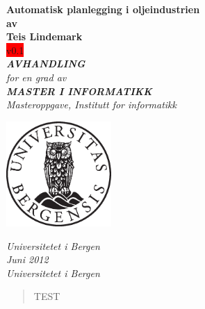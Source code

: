 \documentclass[12pt,twoside,norsk,onecolumn]{article}
\begin{document}
\newcommand{\versjon}{v0.1}

\thispagestyle{empty}
\begin{center}        %
  \vspace{5mm}          %
  \LARGE
  \textbf{Automatisk planlegging i oljeindustrien} \\
  \Large
  \vspace{5mm}
  \textbf{av} \\
  \vspace{5mm}
  \large
  \textbf{Teis Lindemark} \\
  \colorbox{red}{\versjon} \\
  \vspace{30mm}
  \Large
  {\bf{\textsl{AVHANDLING}}} \\
  \textsl{for en grad av} \\
  \vspace{2mm}
  {\bf{\textsl{MASTER I INFORMATIKK}}} \\
  \vspace{5mm}
  {\large \textsl {Masteroppgave, Institutt for informatikk}}\\
  \vspace{10mm}
  \centerline{\includegraphics[width=4cm,height=4cm]{uibugle}}
  \vspace{5mm}
  \textsl{Universitetet i Bergen} \\
  \vspace{10mm}
  \large
  \textsl{Juni 2012} \\
  \vspace{5mm}
  \normalsize
  \textsl{Universitetet i Bergen} \\
\end{center}
\newpage
\vspace*{\fill}
\begin{abstract}
TEST
\end{abstract}
\vspace*{\fill}
\newpage
\end{document}
